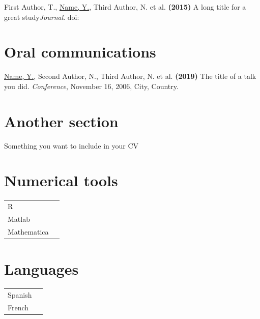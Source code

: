\documentclass[a4paper,10pt]{article}
\begin{document}
\begin{adjustbox}{valign=t}
\begin{minipage}{0.6\textwidth}
\begin{description}
	\item First Author, T., \underline{Name, Y.}, Third Author, N. et al. \textbf{(2015)} A long title for a great study{\it Journal}. doi:~

\end{description}
\section*{Oral communications}
\begin{description}
	\raggedright
	\item \underline{Name, Y.}, Second Author, N., Third Author, N. et al. \textbf{(2019)} The title of a talk you did. {\it Conference}, November 16, 2006, City, Country.
\end{description}
\section*{Another section}
\begin{description}
	\raggedright
	\item Something you want to include in your CV
\end{description}

\MySkip
\begin{multicols}{2}
\section*{Numerical tools}
\begin{tabular}{ll}
	R  			& \SkillBull{$\bullet \bullet \bullet \, \circ$}\\
	Matlab 		& \SkillBull{$\bullet \bullet \bullet \, \circ$}\\
	Mathematica 	& \SkillBull{$\bullet \circ \circ \, \circ$}\\
\end{tabular}

\vfill\null \columnbreak  %

\section*{Languages}
\begin{tabular}{ll}
	Spanish 		& \SkillBull{$\bullet \bullet \bullet \, \circ$}\\
	French 		& \SkillBull{$\bullet \circ \circ \, \circ$}\\
\end{tabular}
\end{multicols}
\LastUpdate
\end{minipage}
\end{adjustbox}
\end{document}
